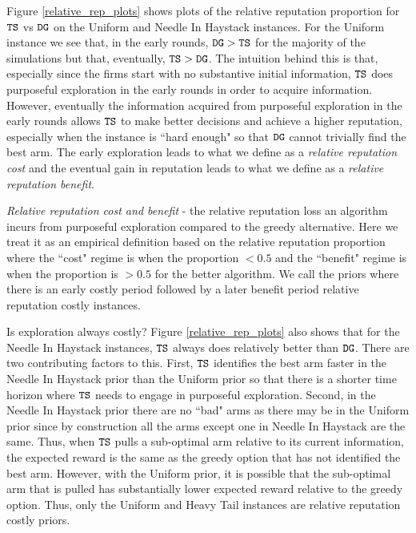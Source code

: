 \documentclass[../competing_bandits.tex]{subfiles}
\begin{document}
Figure \ref{relative_rep_plots} shows plots of the relative reputation proportion for $\mathtt{TS}$ vs $\mathtt{DG}$ on the Uniform and Needle In Haystack instances. For the Uniform instance we see that, in the early rounds, $\mathtt{DG} > \mathtt{TS}$ for the majority of the simulations but that, eventually, $\mathtt{TS} > \mathtt{DG}$. The intuition behind this is that, especially since the firms start with no substantive initial information, $\mathtt{TS}$ does purposeful exploration in the early rounds in order to acquire information. However, eventually the information acquired from purposeful exploration in the early rounds allows $\mathtt{TS}$ to make better decisions and achieve a higher reputation, especially when the instance is ``hard enough" so that $\mathtt{DG}$ cannot trivially find the best arm. The early exploration leads to what we define as a \textit{relative reputation cost} and the eventual gain in reputation leads to what we define as a \textit{relative reputation benefit}.

\begin{definition}
\textit{Relative reputation cost and benefit} - the relative reputation loss an algorithm incurs from purposeful exploration compared to the greedy alternative. Here we treat it as an empirical definition based on the relative reputation proportion where the ``cost" regime is when the proportion $< 0.5$ and the ``benefit" regime is when the proportion is $> 0.5$ for the better algorithm. We call the priors where there is an early costly period followed by a later benefit period relative reputation costly instances.
\end{definition}
Is exploration always costly? Figure \ref{relative_rep_plots} also shows that for the Needle In Haystack instances, $\mathtt{TS}$ always does relatively better than $\mathtt{DG}$. There are two contributing factors to this. First, $\mathtt{TS}$ identifies the best arm faster in the Needle In Haystack prior than the Uniform prior so that there is a shorter time horizon where $\mathtt{TS}$ needs to engage in purposeful exploration. Second, in the Needle In Haystack prior there are no ``bad" arms as there may be in the Uniform prior since by construction all the arms except one in Needle In Haystack are the same. Thus, when $\mathtt{TS}$ pulls a sub-optimal arm relative to its current information, the expected reward is the same as the greedy option that has not identified the best arm. However, with the Uniform prior, it is possible that the sub-optimal arm that is pulled has substantially lower expected reward relative to the greedy option. Thus, only the Uniform and Heavy Tail instances are relative reputation costly priors.
\end{document}

